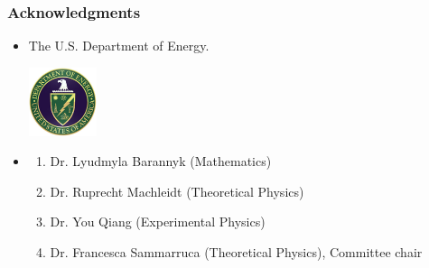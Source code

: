 \documentclass[10pt,serif]{beamer}
\begin{document}
\section{}
\begin{frame}
\frametitle{Acknowledgments}
\begin{itemize}
\item {} The U.S. Department of Energy.
\begin{center}
\includegraphics[width=2cm,height=2cm]{US-Department-of-Energy-logo.jpg}
\end{center}
\item {}
\begin{enumerate}
\item Dr. Lyudmyla Barannyk (Mathematics)
\item Dr. Ruprecht Machleidt (Theoretical Physics)
\item Dr. You Qiang (Experimental Physics)
\item Dr. Francesca Sammarruca (Theoretical Physics), Committee chair
\end{enumerate}
\end{itemize}
\end{frame}
\end{document}
